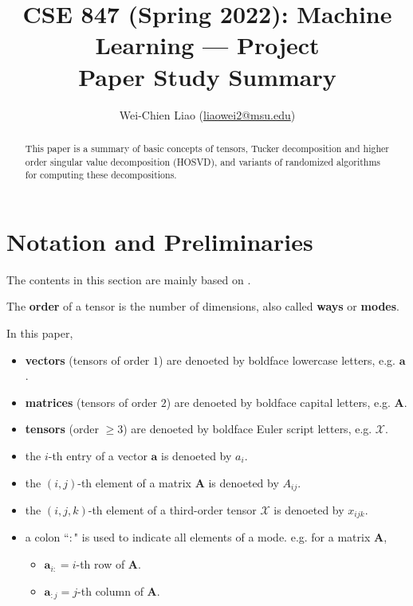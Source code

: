 \documentclass[final]{elsarticle}
\title{\textbf{\large{CSE 847 (Spring 2022): Machine Learning --- Project \\ Paper Study Summary}}}
\author{Wei-Chien Liao (\href{mailto:liaowei2@msu.edu}{liaowei2@msu.edu})}
\date{}
\begin{document}

\begin{frontmatter}
\begin{abstract}
    This paper is a summary of basic concepts of tensors, Tucker decomposition and higher order singular value decomposition (HOSVD), and variants
    of randomized algorithms for computing these decompositions.
\end{abstract}
\end{frontmatter}
\section{Notation and Preliminaries}
\noindent The contents in this section are mainly based on \cite{Kolda2009}.
\begin{defn}
    The \textbf{order} of a tensor is the number of dimensions, also called \textbf{ways} or \textbf{modes}.
\end{defn}
In this paper,
\begin{itemize}
    \item \textbf{vectors} (tensors of order $1$) are denoeted by boldface lowercase letters, e.g. $\mathbf{a}$.
    \item \textbf{matrices} (tensors of order $2$) are denoeted by boldface capital letters, e.g. $\mathbf{A}$.
    \item \textbf{tensors} (order $\geq 3$) are denoeted by boldface Euler script letters, e.g. $\boldsymbol{\mathscr{X}}$.
    \item the $i$-th entry of a vector $\mathbf{a}$ is denoeted by $a_i$.
    \item the $(i,j)$-th element of a matrix $\mathbf{A}$ is denoeted by $A_{ij}$.
    \item the $(i,j,k)$-th element of a third-order tensor $\boldsymbol{\mathscr{X}}$ is denoeted by $x_{ijk}$.
    \item a colon ``$:$" is used to indicate all elements of a mode. e.g. for a matrix $\mathbf{A}$,
    \begin{itemize}
        \item $\mathbf{a}_{i:} = i$-th row of $\mathbf{A}$.
        \item $\mathbf{a}_{:j} = j$-th column of $\mathbf{A}$.
    \end{itemize}
\end{itemize}
\end{document}
